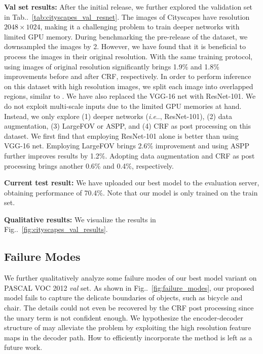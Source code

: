 \documentclass[10pt,journal,compsoc]{IEEEtran}
\makeatletter
\newcommand{\figref}[1]{Fig\onedot~\ref{#1}}
\newcommand{\tabref}[1]{Tab\onedot~\ref{#1}}
\newcommand{\by}[2]{\ensuremath{#1 \! \times \! #2}}
\def\onedot{\ifx\@let@token.\else.\null\fi\xspace}
\def\ie{\emph{i.e}\onedot} \def\Ie{\emph{I.e}\onedot}
\makeatother
\begin{document}
\textbf{Val set results:} After the initial release, we further explored the
validation set in \tabref{tab:cityscapes_val_resnet}. The images of Cityscapes
have resolution \by{2048}{1024}, making it a challenging problem to train deeper
networks with limited GPU memory. During benchmarking the pre-release of the dataset,
we downsampled the images by 2. However, we have found that it is beneficial to
process the images in their original resolution. With the same training protocol,
using images of original resolution significantly brings 1.9\% and 1.8\% improvements
before and after CRF, respectively. In order to perform inference on this dataset with
high resolution images, we split each image into overlapped regions, similar to
\cite{Cordts2016Cityscapes}. We have also replaced the VGG-16 net with ResNet-101.
We do not exploit multi-scale inputs due to the limited GPU memories at hand.
Instead, we only explore (1) deeper networks (\ie, ResNet-101), (2) data augmentation,
(3) LargeFOV or ASPP, and (4) CRF as post processing on this dataset. We first find
that employing ResNet-101 alone is better than using VGG-16 net. Employing LargeFOV
brings 2.6\% improvement and using ASPP further improves results by 1.2\%.
Adopting data augmentation and CRF as post processing brings another 0.6\% and 0.4\%,
respectively.

\textbf{Current test result:} We have uploaded our best model to the evaluation server,
obtaining performance of 70.4\%. Note that our model is only trained on the train set.

\textbf{Qualitative results:} We visualize the results in \figref{fig:cityscapes_val_results}.

\subsection{Failure Modes}
We further qualitatively analyze some failure modes of our best model variant on PASCAL VOC 2012 {\it val} set. As shown in \figref{fig:failure_modes}, our proposed model fails to capture the delicate boundaries of objects, such as bicycle and chair. The details could not even be recovered by the CRF post processing since the unary term is not confident enough. We hypothesize the encoder-decoder structure of 
\cite{badrinarayanan2015segnet, ronneberger2015u} may alleviate the problem by exploiting the high resolution feature maps in the decoder path. How to efficiently incorporate the method is left as a future work.
\end{document}
